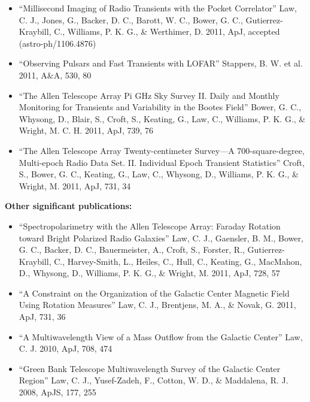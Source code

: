 \documentclass[11pt]{article}
\begin{document}
\begin{itemize}
 \item ``Millisecond Imaging of Radio Transients with the Pocket Correlator'' Law, C. J., Jones, G., Backer, D. C., Barott, W. C., Bower, G. C., Gutierrez-Kraybill, C., Williams, P. K. G., \& Werthimer, D. 2011, ApJ, accepted (astro-ph/1106.4876)

 \item ``Observing Pulsars and Fast Transients with LOFAR'' Stappers, B. W. et al. 2011, A\&A, 530, 80

 \item ``The Allen Telescope Array Pi GHz Sky Survey II. Daily and Monthly Monitoring for Transients and Variability in the Bootes Field'' Bower, G. C., Whysong, D., Blair, S., Croft, S., Keating, G., Law, C., Williams, P. K. G., \& Wright, M. C. H. 2011, ApJ, 739, 76


 \item ``The Allen Telescope Array Twenty-centimeter Survey—A 700-square-degree, Multi-epoch Radio Data Set. II. Individual Epoch Transient Statistics'' Croft, S., Bower, G. C., Keating, G., Law, C., Whysong, D., Williams, P. K. G., \& Wright, M. 2011, ApJ, 731, 34
\end{itemize}

{\bf Other significant publications:}

\begin{itemize}
 \item ``Spectropolarimetry with the Allen Telescope Array:  Faraday Rotation toward Bright Polarized Radio Galaxies'' Law, C. J., Gaensler, B. M., Bower, G. C., Backer, D. C., Bauermeister, A., Croft, S., Forster, R., Gutierrez-Kraybill, C., Harvey-Smith, L., Heiles, C., Hull, C., Keating, G., MacMahon, D., Whysong, D., Williams, P. K. G., \& Wright, M. 2011, ApJ, 728, 57

 \item ``A Constraint on the Organization of the Galactic Center Magnetic Field Using Rotation Measures'' Law, C. J., Brentjens, M. A., \& Novak, G. 2011, ApJ, 731, 36

 \item ``A Multiwavelength View of a Mass Outflow from the Galactic Center'' Law, C. J. 2010, ApJ, 708, 474

 \item ``Green Bank Telescope Multiwavelength Survey of the Galactic Center Region'' Law, C. J., Yusef-Zadeh, F., Cotton, W. D., \& Maddalena, R. J. 2008, ApJS, 177, 255

\end{itemize}
\end{document}
